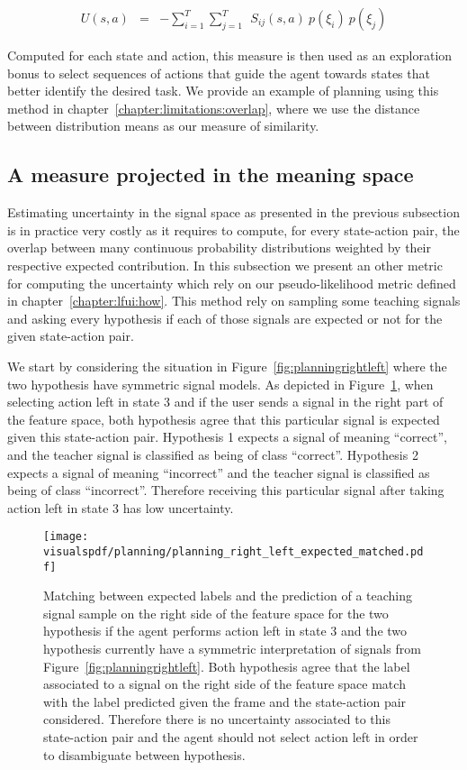 \begin{eqnarray}
U(s,a) &=& - \sum_{i = 1}^{T} \sum_{j = 1}^{T} ~~ S_{ij}(s,a) ~ p(\xi_i) ~ p(\xi_j)
\end{eqnarray}

Computed for each state and action, this measure is then used as an exploration bonus to select sequences of actions that guide the agent towards states that better identify the desired task. We provide an example of planning using this method in chapter~\ref{chapter:limitations:overlap}, where we use the distance between distribution means as our measure of similarity.

\subsection{A measure projected in the meaning space}

Estimating uncertainty in the signal space as presented in the previous subsection is in practice very costly as it requires to compute, for every state-action pair, the overlap between many continuous probability distributions weighted by their respective expected contribution. In this subsection we present an other metric for computing the uncertainty which rely on our pseudo-likelihood metric defined in chapter~\ref{chapter:lfui:how}. This method rely on sampling some teaching signals and asking every hypothesis if each of those signals are expected or not for the given state-action pair. 

We start by considering the situation in Figure~\ref{fig:planningrightleft} where the two hypothesis have symmetric signal models. As depicted in Figure~\ref{fig:uncertaintymeaningrightleftexpectedleft}, when selecting action left in state 3 and if the user sends a signal in the right part of the feature space, both hypothesis agree that this particular signal is expected given this state-action pair. Hypothesis 1 expects a signal of meaning ``correct'', and the teacher signal is classified as being of class ``correct''. Hypothesis 2 expects a signal of meaning ``incorrect'' and the teacher signal is classified as being of class ``incorrect''. Therefore receiving this particular signal after taking action left in state 3 has low uncertainty.

\begin{figure}[!ht]
  \centering
  \texttt{[image: \\visualspdf/planning/planning\_right\_left\_expected\_matched.pdf]}
  \caption{Matching between expected labels and the prediction of a teaching signal sample on the right side of the feature space for the two hypothesis if the agent performs action left in state 3 and the two hypothesis currently have a symmetric interpretation of signals from Figure~\ref{fig:planningrightleft}. Both hypothesis agree that the label associated to a signal on the right side of the feature space match with the label predicted given the frame and the state-action pair considered. Therefore there is no uncertainty associated to this state-action pair and the agent should not select action left in order to disambiguate between hypothesis.}
  \label{fig:uncertaintymeaningrightleftexpectedleft}
\end{figure}

